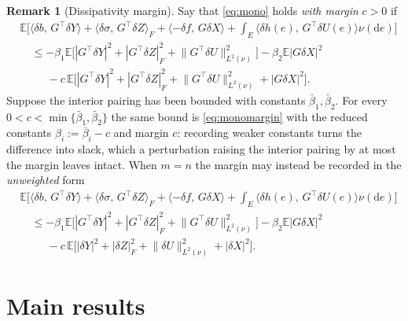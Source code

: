 \documentclass[preprint,12pt]{elsarticle}
\newcommand{\E}{\mathbb{E}}
\newcommand{\diff}{\mathrm{d}}
\newcommand{\inner}[2]{\langle #1,\,#2\rangle}
\newcommand{\Lnu}{L^2(\nu)}
\newcommand{\Gstar}{G^{\!\top}}
\newcommand{\Lnorm}[1]{\lVert #1\rVert_{\Lnu}}
\providecommand{\PaperPageBreak}{}
\numberwithin{equation}{section}
\theoremstyle{plain}
\theoremstyle{definition}
\theoremstyle{\PaperRemarkStyle}
\newtheorem{remark}[theorem]{Remark}
\begin{document}
\begin{remark}[Dissipativity margin]\label{rem:margin}
Say that \eqref{eq:mono} holds \emph{with margin} $c>0$ if
\begin{equation}\label{eq:monomargin}
\begin{aligned}
&\E\!\Big[\inner{\delta b}{\Gstar\delta Y}+\inner{\delta\sigma}{\Gstar\delta Z}_F
+\inner{-\delta f}{G\delta X}+\!\int_E\!\inner{\delta h(e)}{\Gstar\delta U(e)}\nu(\diff e)\Big]\\
&\quad\le-\beta_1\E\big[|\Gstar\delta Y|^2+|\Gstar\delta Z|_F^2+\Lnorm{\Gstar\delta U}^2\big]-\beta_2\E|G\delta X|^2\\
&\qquad\ \ -c\,\E\big[|\Gstar\delta Y|^2+|\Gstar\delta Z|_F^2+\Lnorm{\Gstar\delta U}^2+|G\delta X|^2\big] .
\end{aligned}
\end{equation}
Suppose the interior pairing has been bounded with constants $\bar\beta_1,\bar\beta_2$. For
every $0<c<\min\{\bar\beta_1,\bar\beta_2\}$ the same bound is \eqref{eq:monomargin} with the
reduced constants $\beta_i:=\bar\beta_i-c$ and margin $c$: recording weaker constants turns the
difference into slack, which a perturbation raising the interior pairing by at most the margin
leaves intact. When $m=n$ the margin may instead be recorded in the \emph{unweighted} form
\begin{equation}\label{eq:monomarginu}
\begin{aligned}
&\E\!\Big[\inner{\delta b}{\Gstar\delta Y}+\inner{\delta\sigma}{\Gstar\delta Z}_F
+\inner{-\delta f}{G\delta X}+\!\int_E\!\inner{\delta h(e)}{\Gstar\delta U(e)}\nu(\diff e)\Big]\\
&\quad\le-\beta_1\E\big[|\Gstar\delta Y|^2+|\Gstar\delta Z|_F^2+\Lnorm{\Gstar\delta U}^2\big]-\beta_2\E|G\delta X|^2\\
&\qquad\ \ -c\,\E\big[|\delta Y|^2+|\delta Z|_F^2+\Lnorm{\delta U}^2+|\delta X|^2\big] .
\end{aligned}
\end{equation}
\end{remark}
 \PaperPageBreak
\section{Main results}\label{sec:main}
\end{document}
